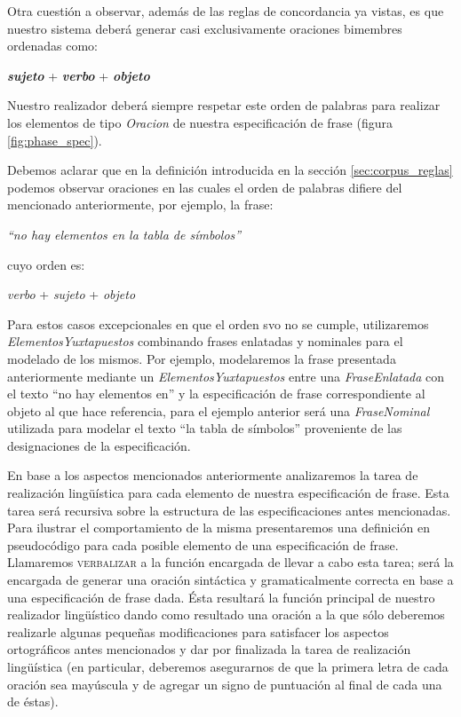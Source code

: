 \bigskip
Otra cuestión a observar, además de las reglas de concordancia ya vistas, es que nuestro sistema deberá generar casi exclusivamente oraciones bimembres ordenadas como:

\begin{center}
\emph{\textbf{sujeto}} + \emph{\textbf{verbo}} + \emph{\textbf{objeto}}
\end{center}

\noindent
Nuestro realizador deberá siempre respetar este orden de palabras para realizar los elementos de tipo \emph{Oracion} de nuestra especificación de frase (figura \ref{fig:phase_spec}). 

Debemos aclarar que en la definición introducida en la sección \ref{sec:corpus_reglas} podemos observar oraciones en las cuales el orden de palabras difiere del mencionado anteriormente, por ejemplo, la frase:

\begin{center}
\emph{``no hay elementos en la tabla de símbolos''}
\end{center}

\noindent
cuyo orden es: 

\begin{center}
\emph{verbo} + \emph{sujeto} + \emph{objeto}
\end{center}

Para estos casos excepcionales en que el orden svo no se cumple, utilizaremos \textit{ElementosYuxtapuestos} combinando frases enlatadas y nominales para el modelado de los mismos. Por ejemplo, modelaremos la frase presentada anteriormente mediante un \emph{ElementosYuxtapuestos} entre una \emph{FraseEnlatada} con el texto ``no hay elementos en'' y la especificación de frase correspondiente al objeto al que hace referencia, para el ejemplo anterior será una \emph{FraseNominal} utilizada para modelar el texto ``la tabla de símbolos'' proveniente de las designaciones de la especificación.


\bigskip
En base a los aspectos mencionados anteriormente analizaremos la tarea de realización lingüística para cada elemento de nuestra especificación de frase. Esta tarea será recursiva sobre la estructura de las especificaciones antes mencionadas. Para ilustrar el comportamiento de la misma presentaremos una definición en pseudocódigo para cada posible elemento de una especificación de frase. Llamaremos \textsc{verbalizar} a la función encargada de llevar a cabo esta tarea; será la encargada de generar una oración sintáctica y gramaticalmente correcta en base a una especificación de frase dada. Ésta resultará la función principal de nuestro realizador lingüístico dando como resultado una oración a la que sólo deberemos realizarle algunas pequeñas modificaciones para satisfacer los aspectos ortográficos antes mencionados y dar por finalizada la tarea de realización lingüística (en particular, deberemos asegurarnos de que la primera letra de cada oración sea mayúscula y de agregar un signo de puntuación al final de cada una de éstas).


